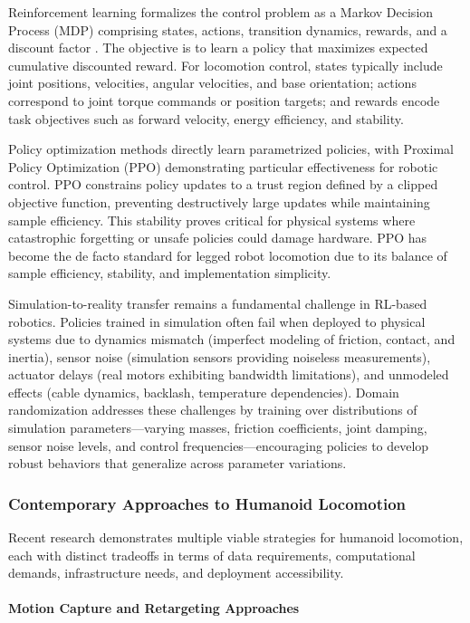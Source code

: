 \documentclass[12pt,a4paper]{article}
\begin{document}
Reinforcement learning formalizes the control problem as a Markov Decision Process (MDP) comprising states, actions, transition dynamics, rewards, and a discount factor \parencite{sutton2018reinforcement}. The objective is to learn a policy that maximizes expected cumulative discounted reward. For locomotion control, states typically include joint positions, velocities, angular velocities, and base orientation; actions correspond to joint torque commands or position targets; and rewards encode task objectives such as forward velocity, energy efficiency, and stability.

Policy optimization methods directly learn parametrized policies, with Proximal Policy Optimization (PPO) demonstrating particular effectiveness for robotic control. PPO constrains policy updates to a trust region defined by a clipped objective function, preventing destructively large updates while maintaining sample efficiency. This stability proves critical for physical systems where catastrophic forgetting or unsafe policies could damage hardware. PPO has become the de facto standard for legged robot locomotion due to its balance of sample efficiency, stability, and implementation simplicity.

Simulation-to-reality transfer remains a fundamental challenge in RL-based robotics. Policies trained in simulation often fail when deployed to physical systems due to dynamics mismatch (imperfect modeling of friction, contact, and inertia), sensor noise (simulation sensors providing noiseless measurements), actuator delays (real motors exhibiting bandwidth limitations), and unmodeled effects (cable dynamics, backlash, temperature dependencies). Domain randomization addresses these challenges by training over distributions of simulation parameters—varying masses, friction coefficients, joint damping, sensor noise levels, and control frequencies—encouraging policies to develop robust behaviors that generalize across parameter variations.

\subsubsection{Contemporary Approaches to Humanoid Locomotion}

Recent research demonstrates multiple viable strategies for humanoid locomotion, each with distinct tradeoffs in terms of data requirements, computational demands, infrastructure needs, and deployment accessibility.

\paragraph{Motion Capture and Retargeting Approaches}
\end{document}
